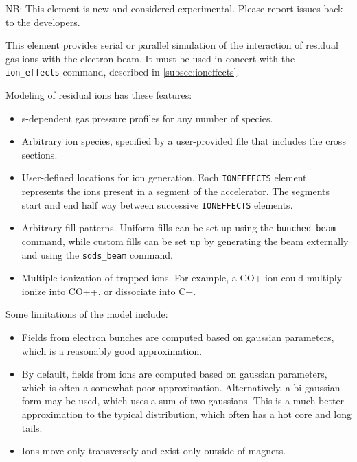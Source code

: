 NB: This element is new and considered experimental. Please report issues back to the developers.

This element provides serial or parallel simulation of the interaction of residual gas ions
with the electron beam.
It must be used in concert with the \verb|ion_effects| command, described in \ref{subsec:ioneffects}.

Modeling of residual ions has these features:
\begin{itemize}
\item s-dependent gas pressure profiles for any number of species.
\item Arbitrary ion species, specified by a user-provided file that includes the cross sections.
\item User-defined locations for ion generation. Each \verb|IONEFFECTS| element represents the
      ions present in a segment of the accelerator. The segments start and end half way between
      successive \verb|IONEFFECTS| elements.
\item Arbitrary fill patterns. Uniform fills can be set up using the \verb|bunched_beam| command,
      while custom fills can be set up by generating the beam externally and using the \verb|sdds_beam| command.
\item Multiple ionization of trapped ions.  For example, a CO+ ion could multiply ionize into CO++, or dissociate into C+.
\end{itemize}

Some limitations of the model include:
\begin{itemize}
\item Fields from electron bunches are computed based on gaussian parameters, which is a reasonably good
  approximation.
\item By default, fields from ions are computed based on gaussian parameters, which is often a somewhat
  poor approximation. Alternatively, a bi-gaussian form may be used, which uses a sum of two gaussians.
  This is a much better approximation to the typical distribution, which often has a hot core and long tails.
\item Ions move only transversely and exist only outside of magnets.
\end{itemize}

